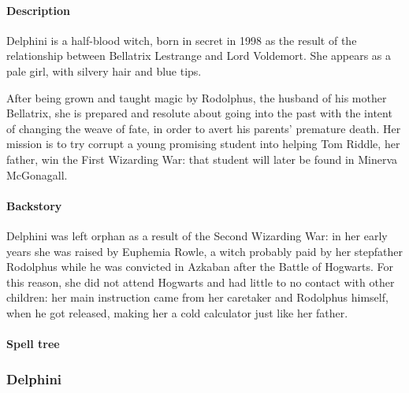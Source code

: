 
\paragraph{Description}
Delphini is a half-blood witch, born in secret in 1998 as the result of the relationship between Bellatrix Lestrange and Lord Voldemort. She appears as a pale girl, with silvery hair and blue tips.

After being grown and taught magic by Rodolphus, the husband of his mother Bellatrix, she is prepared and resolute about going into the past with the intent of changing the weave of fate, in order to avert his parents' premature death. Her mission is to try corrupt a young promising student into helping Tom Riddle, her father, win the First Wizarding War: that student will later be found in Minerva McGonagall. 

\paragraph{Backstory}
Delphini was left orphan as a result of the Second Wizarding War: in her early years she was raised by Euphemia Rowle, a witch probably paid by her stepfather Rodolphus while he was convicted in Azkaban after the Battle of Hogwarts. For this reason, she did not attend Hogwarts and had little to no contact with other children: her main instruction came from her caretaker and Rodolphus himself, when he got released, making her a cold calculator just like her father.
\pagebreak 

\pagebreak 
{} 
\paragraph{Spell tree }
\subsubsection{Delphini}
\clearpage